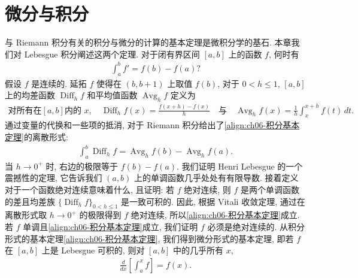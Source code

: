 \documentclass[../main.tex]{subfiles}
\begin{document}
\chapter{微分与积分}\label{chapter:ch06-微分与积分}

与 Riemann 积分有关的积分与微分的计算的基本定理是微积分学的基石. 本章我们对 Lebesgue 积分阐述这两个定理. 对于闭有界区间 $[a,b]$ 上的函数 $f$, 何时有
\begin{align}
\int_{a}^{b}f'=f(b)-f(a)?\label{align:ch06-积分基本定理}
\end{align}
假设 $f$ 是连续的. 延拓 $f$ 使得在 $(b,b+1)$ 上取值 $f(b)$, 对于 $0<h\leqslant 1$, $[a,b]$ 上的均差函数 $\operatorname{Diff}_{h}f$ 和平均值函数 $\operatorname{Avg}_{h}f$ 定义为
\begin{align*}
\text{对所有在}[a,b]\text{内的 }x,\quad\operatorname{Diff}_{h}f(x)=\frac{f(x+h)-f(x)}{h}\quad\text{与}\quad\operatorname{Avg}_{h}f(x)=\frac{1}{h}\int_{x}^{x+h}f(t)\,dt.
\end{align*}
通过变量的代换和一些项的抵消, 对于 Riemann 积分给出了\eqref{align:ch06-积分基本定理}的离散形式:
\begin{align*}
\int_{a}^{b}\operatorname{Diff}_{h}f=\operatorname{Avg}_{h}f(b)-\operatorname{Avg}_{h}f(a).
\end{align*}
当 $h\to 0^{+}$ 时, 右边的极限等于 $f(b)-f(a)$. 我们证明 Henri Lebesgue 的一个震撼性的定理, 它告诉我们 $(a,b)$ 上的单调函数几乎处处有有限导数. 接着定义对于一个函数绝对连续意味着什么, 且证明: 若 $f$ 绝对连续, 则 $f$ 是两个单调函数的差且均差族 $\{\operatorname{Diff}_{h}f\}_{0<h\leqslant 1}$ 是一致可积的. 因此, 根据 Vitali 收敛定理, 通过在离散形式取 $h\to 0^{+}$ 的极限得到 $f$ 绝对连续, 所以\eqref{align:ch06-积分基本定理}成立. 若 $f$ 单调且\eqref{align:ch06-积分基本定理}成立, 我们证明 $f$ 必须是绝对连续的. 从积分形式的基本定理\eqref{align:ch06-积分基本定理}, 我们得到微分形式的基本定理, 即若 $f$ 在 $[a,b]$ 上是 Lebesgue 可积的, 则对 $[a,b]$ 中的几乎所有 $x$,
\begin{align}
\frac{d}{dx}\left[\int_{a}^{x}f\right]=f(x).\label{align:ch06-微分基本定理}
\end{align}












\end{document}
